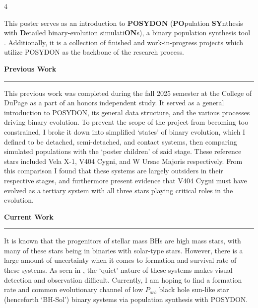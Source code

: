 \documentclass{article}
\newcommand{\bodyfont}{\fontsize{22}{30}\selectfont}
\begin{document}
\setlength{\columnsep}{0.35in}
\raggedcolumns
\begin{multicols}{4}
\bodyfont

\begin{tcolorbox}[sectionbox=Abstract]
  This poster serves as an introduction to \textbf{POSYDON} (\textbf{PO}pulation \textbf{SY}nthesis with \textbf{D}etailed binary-evolution simulati\textbf{ON}s), a binary population synthesis tool \cite{andrews_posydon_2025}\cite{posydon2023}. Additionally, it is a collection of finished and work-in-progress projects which utilize POSYDON as the backbone of the research process. 

  \textbf{Previous Work}
  \vspace{.5cm}
  \hrule
  \vspace{.5cm}
    This previous work was completed during the fall 2025 semester at the College of DuPage as a part of an honors independent study. It served as a general introduction to POSYDON, its general data structure, and the various processes driving binary evolution. To prevent the scope of the project from becoming too constrained, I broke it down into simplified `states' of binary evolution, which I defined to be detached, semi-detached, and contact systems, then comparing simulated populations with the `poster children' of said stage. These reference stars included Vela X-1, V404 Cygni, and W Ursae Majoris respectively. From this comparison I found that these systems are largely outsiders in their respective stages, and furthermore present evidence that V404 Cygni must have evolved as a tertiary system with all three stars playing critical roles in the evolution.  

  \textbf{Current Work}
  \vspace{.5cm}
  \hrule
  \vspace{.5cm}
    It is known that the progenitors of stellar mass BHs are high mass stars, with many of these stars being in binaries with solar-type stars. However, there is a large amount of uncertainty when it comes to formation and survival rate of these systems. As seen in \cite{green_upper_2025}, the `quiet' nature of these systems makes visual detection and observation difficult. Currently, I am hoping to find a formation rate and common evolutionary channel of low \(P_{orb}\) black hole sun-like star (henceforth `BH-Sol') binary systems via population synthesis with POSYDON.


\end{tcolorbox}
\end{multicols}
\end{document}
